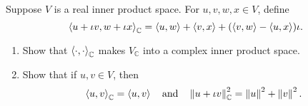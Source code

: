 \begin{exercise}
    Suppose $V$ is a real inner product space. For $u, v, w, x \in V$, define
    \[
        \left\langle{u + \iota v, w + \iota x}\right\rangle_{\mathbb{C}} = \left\langle{u, w}\right\rangle + \left\langle{v, x}\right\rangle + (\left\langle{v, w}\right\rangle - \left\langle{u, x}\right\rangle)\iota.
    \]

    \begin{enumerate}[label={(\alph*)}]
        \item Show that ${\left\langle{\cdot, \cdot}\right\rangle}_{\mathbb{C}}$ makes $V_{\mathbb{C}}$ into a complex inner product space.
        \item Show that if $u, v\in V$, then
              \[
                  {\left\langle{u, v}\right\rangle}_{\mathbb{C}} = \left\langle{u, v}\right\rangle \quad\text{and}\quad \left\Vert{u + \iota v}\right\Vert_{\mathbb{C}}^{2} = \left\Vert{u}\right\Vert^{2} + \left\Vert{v}\right\Vert^{2}.
              \]
    \end{enumerate}
\end{exercise}

